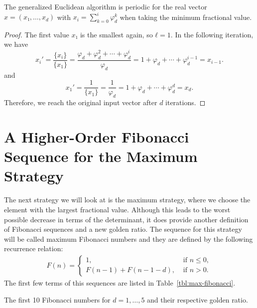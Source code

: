 \begin{theorem}
  The generalized Euclidean algorithm is periodic for the real vector $x = (x₁, …, x_d)$
  with $x_i = \sum_{k=0}^i φ_d^k$ when taking the minimum fractional value.
\end{theorem}

\begin{proof}
  The first value $x₁$ is the smallest again, so $ℓ = 1$.
  In the following iteration, we have
  \[
    x_i' = \frac{\{x_i\}}{\{x_1\}} = \frac{φ_d + φ_d^2 + ⋯ + φ_d^i}{φ_d} = 1 + φ_d + ⋯ + φ_d^{i-1} = x_{i-1}.
  \]
  and
  \[
    x_1' = \frac{1}{\{x_1\}} = \frac{1}{φ_d} = 1 + φ_d + ⋯ + φ_d^d = x_d.
  \]
  Therefore, we reach the original input vector after $d$ iterations.
\end{proof}


\section{A Higher-Order Fibonacci Sequence for the Maximum Strategy}

The next strategy we will look at is the maximum strategy,
where we choose the element with the largest fractional value.
Although this leads to the worst possible decrease in terms of the determinant,
it does provide another definition of Fibonacci sequences and a new golden ratio.
The sequence for this strategy will be called maximum Fibonacci numbers and they
are defined by the following recurrence relation:
\begin{align*}
  F(n) =
  \begin{cases}
    1, & \text{ if } n ≤ 0, \\
    F(n - 1) + F(n - 1 - d), & \text{ if } n > 0.
  \end{cases}
\end{align*}
The first few terms of this sequences are listed in Table~\ref{tbl:max-fibonacci}.

\begin{table}[tbp]
  \caption{The first 10 Fibonacci numbers for $d = 1, …, 5$ and their respective golden ratio.}
  \label{tbl:max-fibonacci}
  \centering
  
\end{table}

